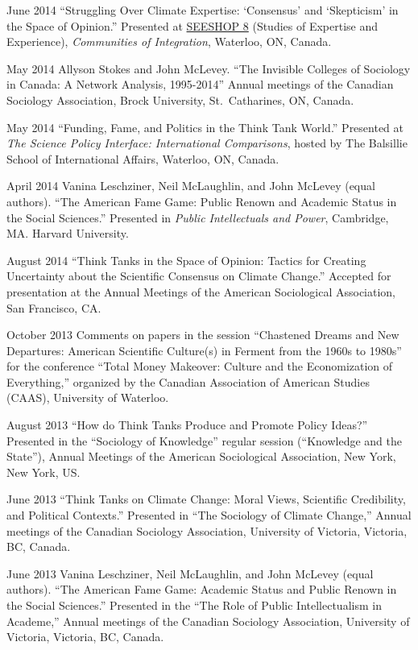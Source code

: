 \ind June 2014 ``Struggling Over Climate Expertise: `Consensus' and
`Skepticism' in the Space of Opinion.'' Presented at
\href{http://www.cf.ac.uk/socsi/contactsandpeople/harrycollins/expertise-project/seeshophome.html}{SEESHOP
8} (Studies of Expertise and Experience),
\emph{Communities of Integration}, Waterloo, ON, Canada.

\ind May 2014 Allyson Stokes and John McLevey. ``The Invisible Colleges
of Sociology in Canada: A Network Analysis, 1995-2014'' Annual meetings
of the Canadian Sociology Association, Brock University, St.~Catharines,
ON, Canada.

\ind May 2014 ``Funding, Fame, and Politics in the Think Tank World.''
Presented at \emph{The Science Policy Interface: International
Comparisons}, hosted by The Balsillie School of International Affairs,
Waterloo, ON, Canada.

\ind April 2014 Vanina Leschziner, Neil McLaughlin, and John McLevey
(equal authors). ``The American Fame Game: Public Renown and Academic
Status in the Social Sciences.'' Presented in \emph{Public Intellectuals
and Power}, Cambridge, MA. Harvard University.

\ind August 2014 ``Think Tanks in the Space of Opinion: Tactics for
Creating Uncertainty about the Scientific Consensus on Climate Change.''
Accepted for presentation at the Annual Meetings of the American
Sociological Association, San Francisco, CA.

\ind October 2013 Comments on papers in the session ``Chastened Dreams
and New Departures: American Scientific Culture(s) in Ferment from the
1960s to 1980s'' for the conference ``Total Money Makeover: Culture and
the Economization of Everything,'' organized by the Canadian Association
of American Studies (CAAS), University of Waterloo.

\ind August 2013 ``How do Think Tanks Produce and Promote Policy
Ideas?'' Presented in the ``Sociology of Knowledge'' regular session
(``Knowledge and the State''), Annual Meetings of the American
Sociological Association, New York, New York, US.

\ind June 2013 ``Think Tanks on Climate Change: Moral Views, Scientific
Credibility, and Political Contexts.'' Presented in ``The Sociology of
Climate Change,'' Annual meetings of the Canadian Sociology Association,
University of Victoria, Victoria, BC, Canada.

\ind June 2013 Vanina Leschziner, Neil McLaughlin, and John McLevey
(equal authors). ``The American Fame Game: Academic Status and Public
Renown in the Social Sciences.'' Presented in the ``The Role of Public
Intellectualism in Academe,'' Annual meetings of the Canadian Sociology
Association, University of Victoria, Victoria, BC, Canada.

